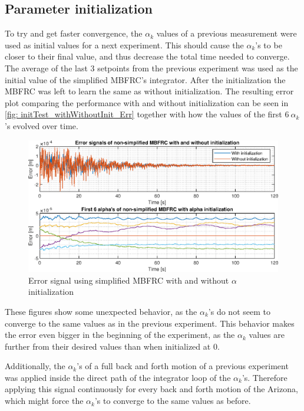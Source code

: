\documentclass[journal]{IEEEtran}
\begin{document}
\subsection{Parameter initialization}
To try and get faster convergence, the $\alpha_k$ values of a previous measurement were used as initial values for a next experiment. This should cause the $\alpha_k$'s to be closer to their final value, and thus decrease the total time needed to converge. The average of the last 3 setpoints from the previous experiment was used as the initial value of the simplified MBFRC's integrator. After the initialization the MBFRC was left to learn the same as without initialization. The resulting error plot comparing the performance with and without initialization can be seen in \autoref{fig: initTest_withWithoutInit_Err} together with how the values of the first $6\ \alpha_k$'s evolved over time.
\begin{figure}
    \centering
    \includegraphics[width=1\linewidth]{figures/initTesting/comp_withWithoutInit_Err_2.eps}
    \caption{Error signal using simplified MBFRC with and without $\alpha$ initialization}
    \label{fig: initTest_withWithoutInit_Err}
\end{figure}
These figures show some unexpected behavior, as the $\alpha_k$'s do not seem to converge to the same values as in the previous experiment. This behavior makes the error even bigger in the beginning of the experiment, as the $\alpha_k$ values are further from their desired values than when initialized at $0$.

Additionally, the $\alpha_k$'s of a full back and forth motion of a previous experiment was applied inside the direct path of the integrator loop of the $\alpha_k$'s. Therefore applying this signal continuously for every back and forth motion of the Arizona, which might force the $\alpha_k$'s to converge to the same values as before.
\end{document}
